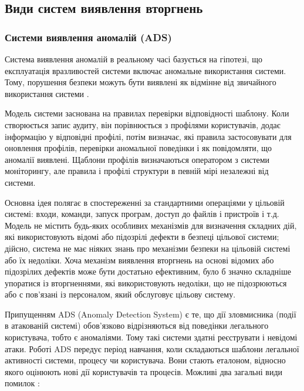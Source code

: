 \newpage
{}
\subsection{Види систем виявлення вторгнень}

\subsubsection{Системи виявлення аномалій (ADS)}

Система виявлення аномалій в реальному часі базується на гіпотезі, що 
експлуатація вразливостей системи включає аномальне використання системи.
Тому, порушення безпеки можуть бути виявлені як відмінне від звичайного
використання системи \cite{denning1987intrusion}.

Модель системи заснована на правилах перевірки відповідності шаблону. Коли
створюється запис аудиту, він порівнюється з профілями користувачів, додає
інформацію у відповідні профілі, потім визначає, які правила застосовувати для
оновлення профілів, перевірки аномальної поведінки і як повідомляти, що аномалії
виявлені. Щаблони профілів визначаються оператором з системи моніторингу, але
правила і профілі структури в певній мірі незалежні від системи.

Основна ідея полягає в спостереженні за стандартними операціями у цільовій
системі: входи, команди, запуск програм, доступ до файлів і пристроїв і т.д. 
Модель не містить будь-яких особливих механізмів для визначення складних дій, 
які використовують відомі або підозрілі дефекти в безпеці цільової системи; 
дійсно, система не має ніяких знань про механізми безпеки на цільовій системі 
або їх недоліки. Хоча механізм виявлення вторгнень на основі відомих або 
підозрілих дефектів може бути достатьно ефективним, було б значно складніше 
упоратися із вторгненнями, які використовують недоліки, що не підозрюються або с 
пов'язані із персоналом, який обслуговує цільову систему.

Припущенням ADS (Anomaly Detection System) є те, що дії зловмисника
(події в атакованій системі) обов'язково відрізняються від поведінки легального
користувача, тобто є аномаліями. Тому такі системи здатні реєструвати і невідомі
атаки. Роботі ADS передує період навчання, коли складаються шаблони легальної
активності системи, процесу чи користувача. Вони стають еталоном, відносно якого
оцінюють нові дії користувачів та процесів. Можливі два загальні види
помилок \cite{axelsson1999base}:

